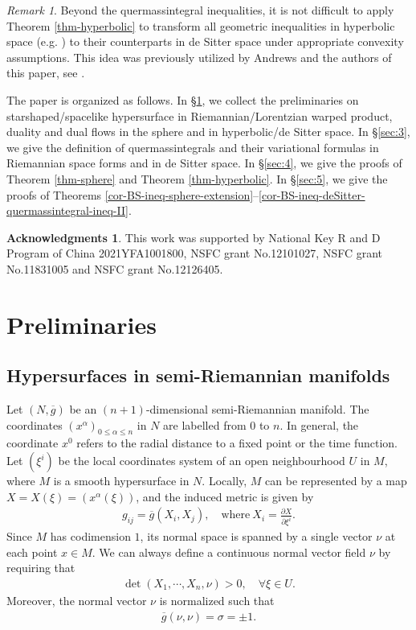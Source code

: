 \documentclass[11pt,reqno]{amsart}
\theoremstyle{definition}
\newtheorem*{ack}{Acknowledgments}
\theoremstyle{remark}
\newtheorem{rem}{Remark}
\numberwithin{equation}{section}
\renewcommand{\(}{\left(}
\renewcommand{\)}{\right)}
\renewcommand{\~}{\tilde}
\renewcommand{\-}{\overline}
\renewcommand{\a}{\alpha}
\newcommand{\s}{\sigma}
\begin{document}
\begin{rem}
Beyond the quermassintegral inequalities, it is not difficult to apply Theorem \ref{thm-hyperbolic} to transform all geometric inequalities in hyperbolic space (e.g. \cite{GeWW14,HL19,Hu-Li-2022,Wang-Xia14,Hu-Li-Wei2020}) to their counterparts in de Sitter space under appropriate convexity assumptions. This idea was previously utilized by Andrews and the authors of this paper, see \cite[Theorem 1.4, Remark 6.4]{AHL2020}.
\end{rem}

The paper is organized as follows. In \S \ref{sec:2}, we collect the preliminaries on starshaped/spacelike hypersurface in Riemannian/Lorentzian warped product, duality and dual flows in the sphere and in hyperbolic/de Sitter space. In \S \ref{sec:3}, we give the definition of quermassintegrals and their variational formulas in Riemannian space forms and in de Sitter space. In \S \ref{sec:4}, we give the proofs of Theorem \ref{thm-sphere} and Theorem \ref{thm-hyperbolic}. In \S \ref{sec:5}, we give the proofs of Theorems \ref{cor-BS-ineq-sphere-extension}--\ref{cor-BS-ineq-deSitter-quermassintegral-ineq-II}.

\begin{ack} This work was supported by National Key R and D Program of China 2021YFA1001800, NSFC grant No.12101027, NSFC grant No.11831005 and NSFC grant No.12126405.
\end{ack}


\section{Preliminaries}\label{sec:2}
\subsection{Hypersurfaces in semi-Riemannian manifolds}
Let $(N,\-g)$ be an $(n+1)$-dimensional semi-Riemannian manifold. The coordinates $(x^\a)_{0\leq \a\leq n}$ in $N$ are labelled from $0$ to $n$. In general, the coordinate $x^0$ refers to the radial distance to a fixed point or the time function. Let $(\xi^i)$ be the local coordinates system of an open neighbourhood $U$ in $M$, where $M$ is a smooth hypersurface in $N$. Locally, $M$ can be represented by a map $X=X(\xi)=(x^\a(\xi))$, and the induced metric is given by
\begin{align*}
g_{ij}=\-g(X_i,X_j), \quad \text{where}~ X_i=\frac{\partial X}{\partial \xi^i}.
\end{align*}
Since $M$ has codimension $1$, its normal space is spanned by a single vector $\nu$ at each point $x\in M$. We can always define a continuous normal vector field $\nu$ by requiring that 
\begin{align*}
\det\(X_1,\cdots,X_n,\nu\)>0, \quad \forall \xi \in U.
\end{align*}
Moreover, the normal vector $\nu$ is normalized such that
\begin{align*}
\-g(\nu,\nu)=\s=\pm 1.
\end{align*} 
\end{document}
